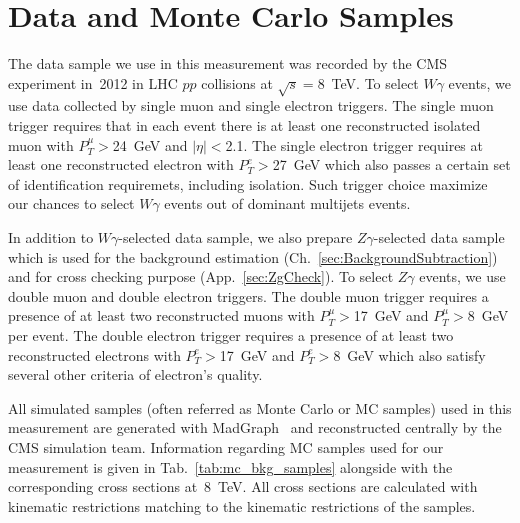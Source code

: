 \section{Data and Monte Carlo Samples}
\label{sec:DataAndMC}

The data sample we use in this measurement was recorded by the CMS experiment in~2012 in LHC $pp$ collisions at $\sqrt{s}=$8~TeV. To select $W\gamma$ events, we use data collected by single muon and single electron triggers. The single muon trigger requires that in each event there is at least one reconstructed isolated muon with $P_T^{\mu}>$24~GeV and $|\eta|<$2.1. The single electron trigger requires at least one reconstructed electron with $P_T^{e}>$27~GeV which also passes a certain set of identification requiremets, including isolation. Such trigger choice maximize our chances to select $W\gamma$ events out of dominant multijets events.

In addition to $W\gamma$-selected data sample, we also prepare $Z\gamma$-selected data sample which is used for the background estimation (Ch.~\ref{sec:BackgroundSubtraction}) and for cross checking purpose (App.~\ref{sec:ZgCheck}). To select $Z\gamma$ events, we use double muon and double electron triggers. The double muon trigger requires a presence of at least two reconstructed muons with $P_T^{\mu}>$17~GeV and $P_T^{\mu}>$8~GeV per event. The double electron trigger requires a presence of at least two reconstructed electrons with $P_T^{e}>$17~GeV and $P_T^{e}>$8~GeV which also satisfy several other criteria of electron's quality.





All simulated samples (often referred as Monte Carlo or MC samples) used in this measurement are generated with MadGraph~\cite{ref_MadGraph} and reconstructed centrally by the CMS simulation team. Information regarding MC samples used for our measurement is given in Tab.~\ref{tab:mc_bkg_samples} alongside with the corresponding cross sections at~8~TeV. All cross sections are calculated with kinematic restrictions matching to the kinematic restrictions of the samples. 

